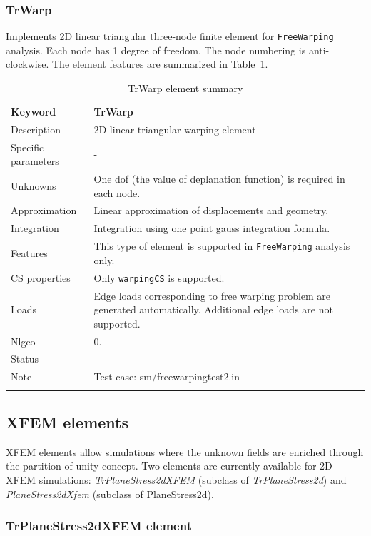 \documentclass[a4paper]{article}
\newcommand{\param}[1]{\texttt{#1}} %
\newcommand{\templabel}{}%
\newcommand{\tempcaption}{}%
\newcounter{nelpar}
\newenvironment{elementsummary}[5]{%
  \gdef\tempcaption{#4}%
  \gdef\templabel{#5}%
  \setcounter{nelpar}{0}%
  \begin{center} %
    \begin{table}[!htb] %
      \begin{tabular}{|l|p{9cm}|}\hline %
        {\bf Keyword} & \bf{#1}\\ %
        {Description} & {#2}\\ %
        {Specific parameters} & {#3}\\ \hline %
}{
  \\ \hline %
      \end{tabular}%
      \caption{\tempcaption}%
      \label{\templabel}%
    \end{table}%
  \end{center}%
}
\newcommand{\elementDescription}[2]{{#1} & {#2}\\}
\begin{document}
\subsubsection{TrWarp}
Implements 2D linear triangular three-node finite element for \param{FreeWarping} analysis. Each node has 1 degree of freedom.
The node numbering is anti-clockwise. The element features are summarized in Table~\ref{TrWarpsummary}.


\begin{elementsummary}{TrWarp}{2D linear triangular warping element}{-}{TrWarp element summary}{TrWarpsummary}
\elementDescription{Unknowns}{One dof (the value of deplanation function) is required in each node.}
\elementDescription{Approximation}{Linear approximation of displacements and geometry.}
\elementDescription{Integration}{Integration using one point gauss integration formula.}
\elementDescription{Features}{This type of element is supported in \param{FreeWarping} analysis only.}
\elementDescription{CS properties}{Only \param{warpingCS} is supported.}
\elementDescription{Loads}{Edge loads corresponding to free warping problem are generated automatically. Additional edge loads are not supported.}
\elementDescription{Nlgeo}{0.}
\elementDescription{Status}{-}
\elementDescription{Note}{Test case: sm/freewarpingtest2.in}
\end{elementsummary}

\clearpage
\subsection{XFEM elements}
XFEM elements allow simulations where the unknown fields are enriched through
the partition of unity concept. Two elements are currently available for 2D XFEM
simulations: \textit{TrPlaneStress2dXFEM} (subclass of \textit{TrPlaneStress2d})
and \textit{PlaneStress2dXfem} (subclass of PlaneStress2d).

\subsubsection{TrPlaneStress2dXFEM element}
\end{document}
